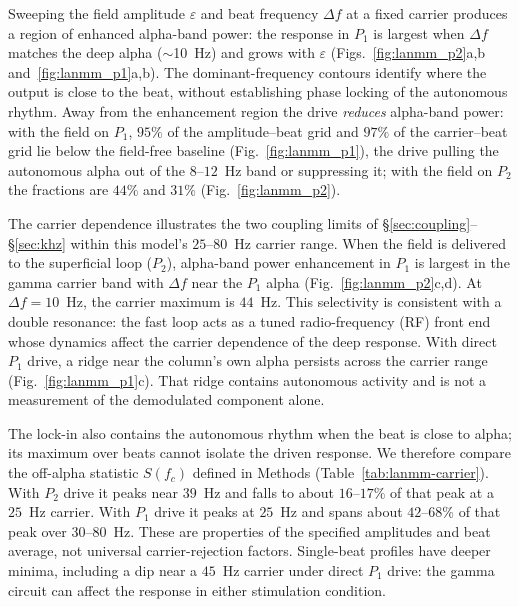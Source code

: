 \documentclass[11pt,a4paper]{article}
\begin{document}
Sweeping the field amplitude $\varepsilon$ and beat frequency $\Delta f$ at a fixed
carrier produces a region of enhanced alpha-band power: the response in $P_1$ is largest
when $\Delta f$ matches the deep alpha ($\sim$10~Hz) and grows with $\varepsilon$
(Figs.~\ref{fig:lanmm_p2}a,b and~\ref{fig:lanmm_p1}a,b). The dominant-frequency
contours identify where the output is close to the beat, without establishing
phase locking of the autonomous rhythm. Away from the enhancement region the drive
\emph{reduces} alpha-band power: with the field on $P_1$, $95\%$ of the amplitude--beat
grid and $97\%$ of the carrier--beat grid lie below the field-free baseline
(Fig.~\ref{fig:lanmm_p1}), the drive pulling the autonomous alpha out of the $8$--$12$~Hz
band or suppressing it; with the field on $P_2$ the fractions are $44\%$ and $31\%$
(Fig.~\ref{fig:lanmm_p2}).

The carrier dependence illustrates the two coupling limits of
\S\ref{sec:coupling}--\S\ref{sec:khz} within this model's $25$--$80$~Hz carrier
range. When the field is delivered to the superficial loop ($P_2$), alpha-band
power enhancement in $P_1$ is largest in the gamma carrier band with
$\Delta f$ near the $P_1$ alpha (Fig.~\ref{fig:lanmm_p2}c,d). At
$\Delta f=10$~Hz, the carrier maximum is $44$~Hz. This selectivity is consistent with a double
resonance: the fast loop acts as a tuned
radio-frequency (RF) front end whose dynamics affect the carrier dependence of
the deep response. With direct $P_1$ drive, a ridge near the column's own alpha
persists across the carrier range (Fig.~\ref{fig:lanmm_p1}c). That ridge contains
autonomous activity and is not a measurement of the demodulated component alone.

The lock-in also contains the autonomous rhythm when the beat is close to alpha;
its maximum over beats cannot isolate the driven response. We therefore compare
the off-alpha statistic $S(f_c)$ defined in Methods (Table~\ref{tab:lanmm-carrier}).
With $P_2$ drive it peaks near $39$~Hz and falls to about $16$--$17\%$ of that
peak at a $25$~Hz carrier. With $P_1$ drive it peaks at $25$~Hz and spans about
$42$--$68\%$ of that peak over $30$--$80$~Hz. These are properties of the
specified amplitudes and beat average, not universal carrier-rejection factors.
Single-beat profiles have deeper minima, including a dip near a $45$~Hz carrier
under direct $P_1$ drive: the gamma circuit can affect the response in either
stimulation condition.
\end{document}
